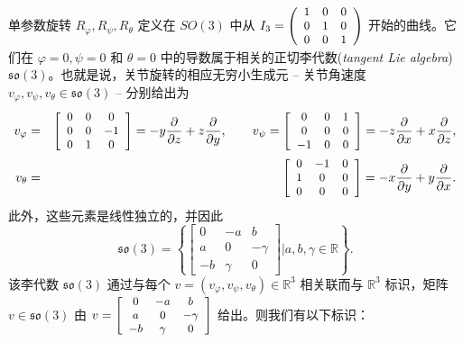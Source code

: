\documentclass[11pt,fontset=founder]{ctexart}
\begin{document}
单参数旋转 $R_{\varphi },R_{\psi },R_{\theta }$ 定义在 $SO(3)$ 中从 $I_{3}={\small \left(
\begin{array}{ccc}
1 & 0 & 0 \\
0 & 1 & 0 \\
0 & 0 & 1%
\end{array}
\right)}$ 开始的曲线。它们在 $\varphi =0,\psi =0$ 和 $\theta =0$ 中的导数属于相关的正切李代数(\emph{tangent Lie algebra}) $\mathfrak{so}(3)$。也就是说，关节旋转的相应无穷小生成元 -- 关节角速度 $v_{\varphi },v_{\psi },v_{\theta }\in \mathfrak{so}(3)$ -- 分别给出为
\begin{eqnarray*}
v_{\varphi } &=&{\small \left[
\begin{array}{ccc}
0 & 0 & 0 \\
0 & 0 & -1 \\
0 & 1 & 0%
\end{array}%
\right]} =-y\frac{\partial }{\partial z}+z\frac{\partial }{\partial y}%
,\qquad v_{\psi }={\small \left[
\begin{array}{ccc}
0 & 0 & 1 \\
0 & 0 & 0 \\
-1 & 0 & 0%
\end{array}%
\right]} =-z\frac{\partial }{\partial x}+x\frac{\partial }{\partial z}, \\
v_{\theta } &=&{\small \left[
\begin{array}{ccc}
0 & -1 & 0 \\
1 & 0 & 0 \\
0 & 0 & 0%
\end{array}%
\right]} =-x\frac{\partial }{\partial y}+y\frac{\partial }{\partial x}.
\end{eqnarray*}
此外，这些元素是线性独立的，并因此
\begin{equation*}
\mathfrak{so}(3)=\left\{ \left[
\begin{array}{ccc}
0 & -a & b \\
a & 0 & -\gamma \\
-b & \gamma & 0%
\end{array}
\right] |a,b,\gamma \in \mathbb{R}\right\}.
\end{equation*}
该李代数 $\mathfrak{so}(3)$ 通过与每个 $v=(v_{\varphi },v_{\psi },v_{\theta })\in \mathbb{R}^{3} $ 相关联而与 $\mathbb{R}^{3}$ 标识，矩阵 $v\in \mathfrak{so}(3)$ 由 $v={\small \left[
\begin{array}{ccc}
0 & -a & b \\
a & 0 & -\gamma \\
-b & \gamma & 0%
\end{array}
\right]}$ 给出。则我们有以下标识：
\end{document}
